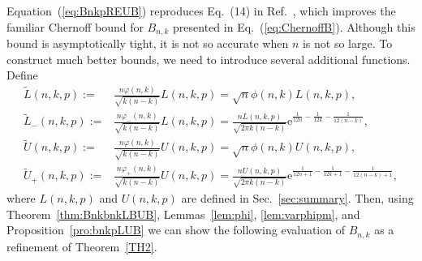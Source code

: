 \documentclass[aop]{imsart}
\theoremstyle{plain}
\theoremstyle{remark}
\newcommand{\rme}{\mathrm{e}}
\newcommand{\1}{\operatorname{\uppercase\expandafter{\romannumeral1}}}
\newcommand{\2}{\operatorname{\uppercase\expandafter{\romannumeral2}}}
\newcommand{\3}{\operatorname{\uppercase\expandafter{\romannumeral3}}}
\newcommand{\4}{\operatorname{\uppercase\expandafter{\romannumeral4}}}
\newcommand{\5}{\operatorname{\uppercase\expandafter{\romannumeral5}}}
\newcommand{\6}{\operatorname{\uppercase\expandafter{\romannumeral6}}}
\newcommand{\7}{\operatorname{\uppercase\expandafter{\romannumeral7}}}
\newcommand{\8}{\operatorname{\uppercase\expandafter{\romannumeral8}}}
\newcommand{\9}{\operatorname{\uppercase\expandafter{\romannumeral9}}}
\newcommand{\eref}[1]{Eq.~\textup{(\ref{#1})}}
\newcommand{\Eref}[1]{Equation~\textup{(\ref{#1})}}
\newcommand{\thref}[1]{Theorem~\ref{#1}}
\newcommand{\lsref}[1]{Lemmas~\ref{#1}}
\newcommand{\pref}[1]{Proposition~\ref{#1}}
\newcommand{\sref}[1]{Sec.~\ref{#1}}
\newcommand{\rcite}[1]{Ref.~\cite{#1}}
\begin{document}
\Eref{eq:BnkpREUB} reproduces  Eq.~(14) in \rcite{Ferr21}, which improves the familiar Chernoff bound for $B_{n,k}$ presented in \eref{eq:ChernoffB}. Although this bound is asymptotically tight, it is not so accurate when $n$ is not so large. To construct much better bounds, we need to introduce several additional functions. Define
\begin{align} 
\tilde{L}(n,k,p):=&\frac{n\varphi(n,k)}{\sqrt{k(n-k)}}L(n,k,p)=\sqrt{n}\phi(n,k) L(n,k,p),\label{eq:LTnkp}\\
\tilde{L}_-(n,k,p):=&\frac{n\varphi_-(n,k)}{\sqrt{k(n-k)}}L(n,k,p)=
\frac{nL(n,k,p)}{ \sqrt{2\pi k(n-k)}}\rme^{\frac{1}{12n}-\frac{1}{12k}-\frac{1}{12(n-k)}},\label{eq:LT-nkp}\\
\tilde{U}(n,k,p):=&\frac{n\varphi(n,k)}{\sqrt{k(n-k)}}U(n,k,p)=\sqrt{n}\phi(n,k) U(n,k,p), \label{eq:UTnkp}\\
\tilde{U}_+(n,k,p):=&\frac{n\varphi_+(n,k)}{\sqrt{k(n-k)}}U(n,k,p)=
\frac{nU(n,k,p)}{ \sqrt{2\pi k(n-k)}}\rme^{\frac{1}{12n+1}-\frac{1}{12k+1}-\frac{1}{12(n-k)+1}}, \label{eq:UT+nkp}
\end{align}
where  $L(n,k,p)$ and $U(n,k,p)$ are defined in \sref{sec:summary}. 
Then, using \thref{thm:BnkbnkLBUB}, \lsref{lem:phi}, \ref{lem:varphipm}, and \pref{pro:bnkpLUB} 
we can show the following evaluation of $B_{n,k}$
as a refinement  of \thref{TH2}.
\end{document}

